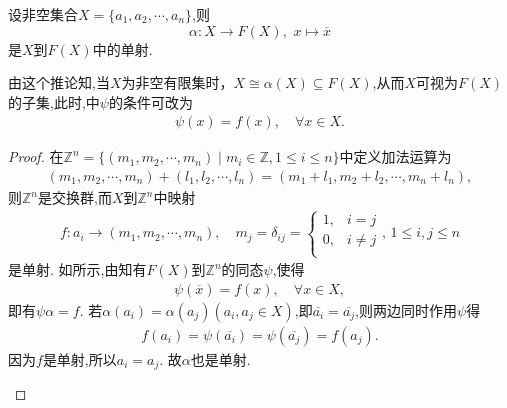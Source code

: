 \documentclass[../../main.tex]{subfiles}%
\begin{document}
\begin{corollary}\label{corollary:抽象代数--推论4.8.1}
设非空集合$X=\{a_1,a_2,\cdots,a_n\}$,则
$$
\alpha: X\to F(X),\,\,x\mapsto \overline{x}
$$
是$X$到$F(X)$中的单射.
\end{corollary}
\begin{remark}
由这个推论知,当$X$为非空有限集时，$X\cong \alpha(X)\subseteq F(X)$,从而$X$可视为$F(X)$的子集,此时,中$\psi$的条件可改为
\begin{align*}
\psi(x) = f(x),\quad \forall x\in X.
\end{align*}
\end{remark}
\begin{proof}
在$\mathbb{Z}^n = \{(m_1,m_2,\cdots,m_n)\mid m_i\in \mathbb{Z},1\leqslant i\leqslant n\}$中定义加法运算为
\begin{align*}
(m_1,m_2,\cdots,m_n)+(l_1,l_2,\cdots,l_n) = (m_1+l_1,m_2+l_2,\cdots,m_n+l_n),
\end{align*}
则$\mathbb{Z}^n$是交换群,而$X$到$\mathbb{Z}^n$中映射
\begin{align*}
f: a_i\to (m_1,m_2,\cdots,m_n),\quad m_j=\delta _{ij}=\begin{cases}
1,&i=j\\
0,&i\ne j\\
\end{cases},\,1\leqslant i,j\leqslant n
\end{align*}
是单射.
如所示,由知有$F(X)$到$\mathbb{Z}^n$的同态$\psi$,使得
\begin{align*}
\psi(\overline{x}) = f(x),\quad \forall x\in X,
\end{align*}
即有$\psi\alpha = f$. 若$\alpha \left( a_i \right) =\alpha \left( a_j \right) \left( a_i,a_j\in X \right) $,即$\overline{a_i}=\overline{a_j}$,则两边同时作用$\psi$得
\begin{align*}
f\left( a_i \right) =\psi \left( \overline{a_i} \right) =\psi \left( \overline{a_j} \right) =f\left( a_j \right) .
\end{align*}
因为$f$是单射,所以$a_i=a_j.$
故$\alpha$也是单射.
\begin{figure}[H]
\centering
\caption{}
\label{figure:抽代--交换图4.8.1}
\end{figure}\end{proof}
\end{document}
